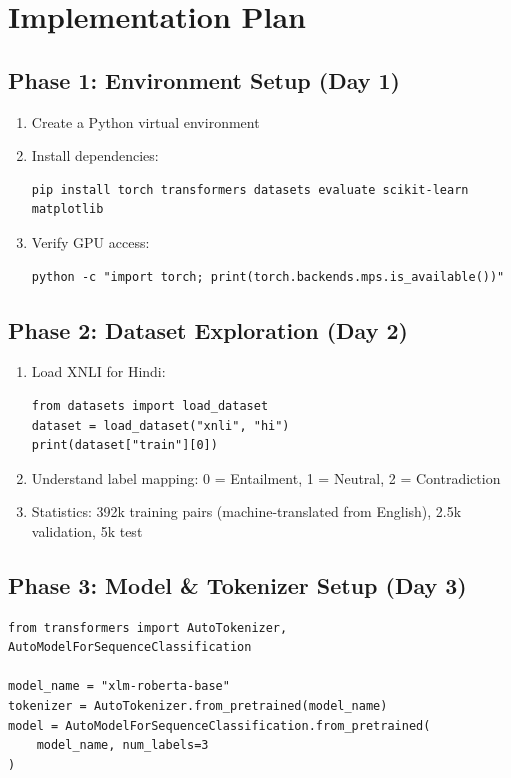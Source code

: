 \section{Implementation Plan}

\subsection{Phase 1: Environment Setup (Day 1)}

\begin{enumerate}[nosep]
    \item Create a Python virtual environment
    \item Install dependencies:
\begin{verbatim}
pip install torch transformers datasets evaluate scikit-learn matplotlib
\end{verbatim}
    \item Verify GPU access:
\begin{verbatim}
python -c "import torch; print(torch.backends.mps.is_available())"
\end{verbatim}
\end{enumerate}

\subsection{Phase 2: Dataset Exploration (Day 2)}

\begin{enumerate}[nosep]
    \item Load XNLI for Hindi:
\begin{verbatim}
from datasets import load_dataset
dataset = load_dataset("xnli", "hi")
print(dataset["train"][0])
\end{verbatim}
    \item Understand label mapping: 0 = Entailment, 1 = Neutral, 2 = Contradiction
    \item Statistics: 392k training pairs (machine-translated from English), 2.5k validation, 5k test
\end{enumerate}

\subsection{Phase 3: Model \& Tokenizer Setup (Day 3)}

\begin{verbatim}
from transformers import AutoTokenizer, AutoModelForSequenceClassification

model_name = "xlm-roberta-base"
tokenizer = AutoTokenizer.from_pretrained(model_name)
model = AutoModelForSequenceClassification.from_pretrained(
    model_name, num_labels=3
)
\end{verbatim}

